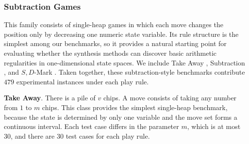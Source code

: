\documentclass[review]{elsarticle}
\newcommand{\set}[1]{\{ #1 \}}
\newcommand{\tuple}[1]{\langle {#1} \rangle}
\newcommand{\true}{\top}
\newcommand{\statevar}{\mathcal{X}}
\newcommand{\act}{\mathcal{A}}
\newcommand{\constraint}{\mathcal{C}}
\newcommand{\estate}{\mathcal{E}}
\newcommand{\pre}{\mathtt{pre}}
\newcommand{\eff}{\mathtt{eff}}
\begin{document}
{\color{red}\subsubsection{Subtraction Games}}
{\color{red}This family consists of single-heap games in which each move changes the position only by decreasing one numeric state variable.}
{\color{red}Its rule structure is the simplest among our benchmarks, so it provides a natural starting point for evaluating whether the synthesis methods can discover basic arithmetic regularities in one-dimensional state spaces.}
{\color{red}We include Take Away \cite{Gol1966}, Subtraction \cite{Yag2001}, and $S,D$-Mark \cite{Sop2016}.}
{\color{red}Taken together, these subtraction-style benchmarks contribute $479$ experimental instances under each play rule.}

{\color{red}\textbf{Take Away}. There is a pile of $v$ chips.}
{\color{red}A move consists of taking any number from $1$ to $m$ chips.}
{\color{red}This class provides the simplest single-heap benchmark, because the state is determined by only one variable and the move set forms a continuous interval.}
{\color{red}Each test case differs in the parameter $m$, which is at most $30$, and there are $30$ test cases for each play rule.}
\end{document}
